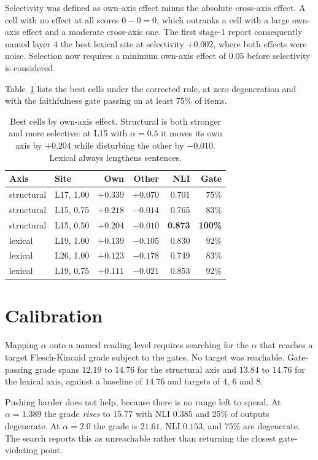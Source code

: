 \documentclass[twocolumn,10pt,a4paper]{article}
\begin{document}
Selectivity was defined as own-axis effect minus the absolute cross-axis effect.
A cell with no effect at all scores $0 - 0 = 0$, which outranks a cell with a
large own-axis effect and a moderate cross-axis one. The first stage-1 report
consequently named layer 4 the best lexical site at selectivity $+0.002$, where
both effects were noise. Selection now requires a minimum own-axis effect of
$0.05$ before selectivity is considered.

Table~\ref{tab:best} lists the best cells under the corrected rule, at zero
degeneration and with the faithfulness gate passing on at least 75\% of items.

\begin{table}[t]
\centering
\small
\begin{tabular}{llrrrr}
\toprule
Axis & Site & Own & Other & NLI & Gate \\
\midrule
structural & L17, 1.00 & $+0.339$ & $+0.070$ & 0.701 & 75\% \\
structural & L15, 0.75 & $+0.218$ & $-0.014$ & 0.765 & 83\% \\
structural & L15, 0.50 & $+0.204$ & $-0.010$ & \textbf{0.873} & \textbf{100\%} \\
lexical    & L19, 1.00 & $+0.139$ & $-0.105$ & 0.830 & 92\% \\
lexical    & L26, 1.00 & $+0.123$ & $-0.178$ & 0.749 & 83\% \\
lexical    & L19, 0.75 & $+0.111$ & $-0.021$ & 0.853 & 92\% \\
\bottomrule
\end{tabular}
\caption{Best cells by own-axis effect. Structural is both stronger and more
selective: at L15 with $\alpha=0.5$ it moves its own axis by $+0.204$ while
disturbing the other by $-0.010$. Lexical always lengthens sentences.}
\label{tab:best}
\end{table}

\section{Calibration}

Mapping $\alpha$ onto a named reading level requires searching for the $\alpha$
that reaches a target Flesch-Kincaid grade subject to the gates. No target was
reachable. Gate-passing grade spans $12.19$ to $14.76$ for the structural axis
and $13.84$ to $14.76$ for the lexical axis, against a baseline of $14.76$ and
targets of 4, 6 and 8.

Pushing harder does not help, because there is no range left to spend. At
$\alpha = 1.389$ the grade \emph{rises} to $15.77$ with NLI $0.385$ and 25\% of
outputs degenerate. At $\alpha = 2.0$ the grade is $21.61$, NLI $0.153$, and 75\%
are degenerate. The search reports this as unreachable rather than returning the
closest gate-violating point.
\end{document}

